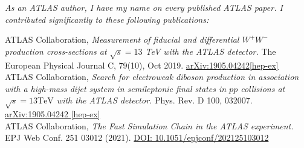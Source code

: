 \documentclass[letter,11pt]{article}
\begin{document}
\textit{\small{As an ATLAS author, I have my name on every published ATLAS paper. I contributed significantly to these following publications:}}\par\vspace{-.05em}
\linebreak

ATLAS Collaboration, {\it Measurement of fiducial and differential $W^+W^-$ production cross-sections
at $\sqrt{s}=13$ TeV with the ATLAS detector.}  The European Physical Journal
C, 79(10), Oct 2019. \href{https://arxiv.org/abs/1905.04242}{arXiv:1905.04242[hep-ex]}
\\
ATLAS Collaboration, {\it Search for electroweak diboson production in association with a high-mass dijet system in semileptonic final states in $pp$ collisions at $\sqrt{s}=13 \mathrm{TeV}$ with the ATLAS detector.} Phys. Rev. D 100, 032007. \href{https://arxiv.org/abs/1905.07714}{arXiv:1905.04242 [hep-ex]} 
\\
ATLAS Collaboration, {\it The Fast Simulation Chain in the ATLAS experiment.} EPJ Web Conf. 251 03012 (2021). \href{https://www.epj-conferences.org/articles/epjconf/abs/2021/05/epjconf_chep2021_03012/epjconf_chep2021_03012.html}{DOI: 10.1051/epjconf/202125103012}
\end{document}
